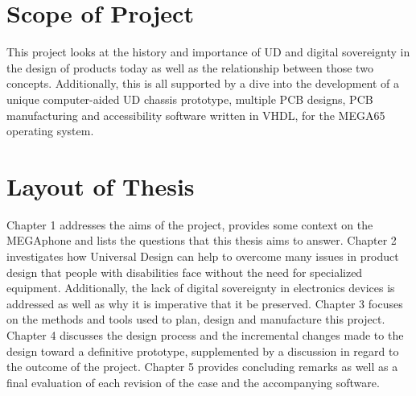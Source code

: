 
\section{Scope of Project}

This project looks at the history and importance of UD and digital sovereignty in the design of products today as well as the relationship between those two concepts. 
Additionally, this is all supported by a dive into the development of a unique computer-aided UD chassis prototype, multiple PCB designs, PCB manufacturing and accessibility software written in VHDL, for the MEGA65 operating system.


\section{Layout of Thesis}

Chapter 1 addresses the aims of the project, provides some context on the MEGAphone and lists the questions that this thesis aims to answer.
Chapter 2 investigates how Universal Design can help to overcome many issues in product design that people with disabilities face without the need for specialized equipment. 
Additionally, the lack of digital sovereignty in electronics devices is addressed as well as why it is imperative that it be preserved.
Chapter 3 focuses on the methods and tools used to plan, design and manufacture this project.
Chapter 4 discusses the design process and the incremental changes made to the design toward a definitive prototype, supplemented by a discussion in regard to the outcome of the project. 
Chapter 5 provides concluding remarks as well as a final evaluation of each revision of the case and the accompanying software.